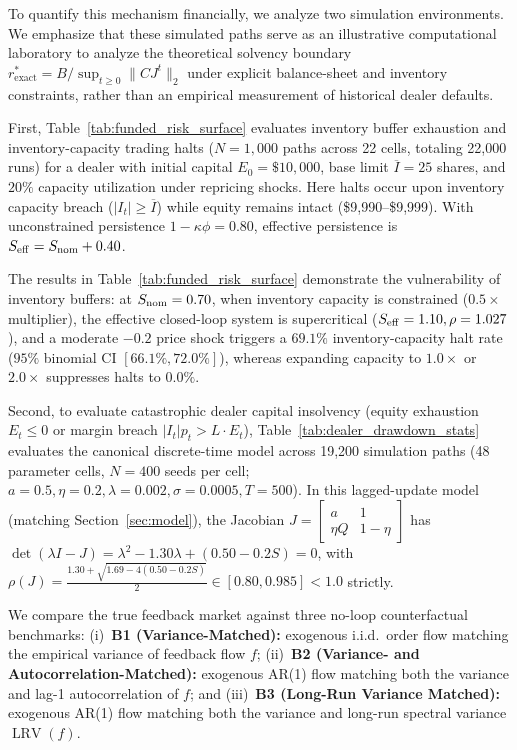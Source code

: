 \documentclass[12pt]{article}
\theoremstyle{definition}
\theoremstyle{remark}
\begin{document}
To quantify this mechanism financially, we analyze two simulation environments. We emphasize that these simulated paths serve as an illustrative computational laboratory to analyze the theoretical solvency boundary $r^*_{\text{exact}} = B / \sup_{t \ge 0} \|C J^t\|_2$ under explicit balance-sheet and inventory constraints, rather than an empirical measurement of historical dealer defaults.

First, Table~\ref{tab:funded_risk_surface} evaluates inventory buffer exhaustion and inventory-capacity trading halts ($N = 1{,}000$ paths across 22 cells, totaling 22,000 runs) for a dealer with initial capital $E_0 = \$10{,}000$, base limit $\overline{I} = 25$ shares, and $20\%$ capacity utilization under repricing shocks. Here halts occur upon inventory capacity breach ($|I_t| \ge \overline{I}$) while equity remains intact (\$9,990--\$9,999). With unconstrained persistence $1 - \kappa \phi = 0.80$, effective persistence is $S_{\rm eff} = S_{\rm nom} + 0.40$.



The results in Table~\ref{tab:funded_risk_surface} demonstrate the vulnerability of inventory buffers: at $S_{\rm nom}=0.70$, when inventory capacity is constrained ($0.5\times$ multiplier), the effective closed-loop system is supercritical ($S_{\rm eff} = 1.10, \rho = 1.027$), and a moderate $-0.2$ price shock triggers a $69.1\%$ inventory-capacity halt rate ($95\%$ binomial CI $[66.1\%, 72.0\%]$), whereas expanding capacity to $1.0\times$ or $2.0\times$ suppresses halts to $0.0\%$.

Second, to evaluate catastrophic dealer capital insolvency (equity exhaustion $E_t \le 0$ or margin breach $|I_t| p_t > L \cdot E_t$), Table~\ref{tab:dealer_drawdown_stats} evaluates the canonical discrete-time model across 19,200 simulation paths (48 parameter cells, $N=400$ seeds per cell; $a=0.5, \eta=0.2, \lambda=0.002, \sigma=0.0005, T=500$). In this lagged-update model (matching Section~\ref{sec:model}), the Jacobian $J = \begin{bmatrix} a & 1 \\ \eta Q & 1 - \eta \end{bmatrix}$ has $\det(\lambda I - J) = \lambda^2 - 1.30 \lambda + (0.50 - 0.2 S) = 0$, with $\rho(J) = \frac{1.30 + \sqrt{1.69 - 4(0.50 - 0.2 S)}}{2} \in [0.80, 0.985] < 1.0$ strictly.

We compare the true feedback market against three no-loop counterfactual benchmarks: (i)~\textbf{B1 (Variance-Matched):} exogenous i.i.d.\ order flow matching the empirical variance of feedback flow $f$; (ii)~\textbf{B2 (Variance- and Autocorrelation-Matched):} exogenous AR(1) flow matching both the variance and lag-1 autocorrelation of $f$; and (iii)~\textbf{B3 (Long-Run Variance Matched):} exogenous AR(1) flow matching both the variance and long-run spectral variance $\operatorname{LRV}(f)$.
\end{document}
